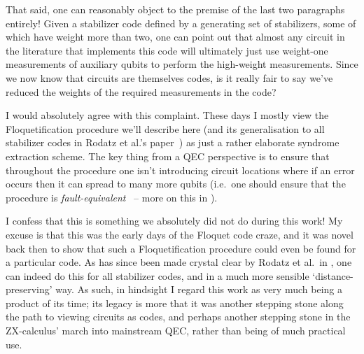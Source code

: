 That said, one can reasonably object to the premise of the last two paragraphs entirely!
Given a stabilizer code defined by a generating set of stabilizers, some of which have weight more than two, one can point out that almost any circuit in the literature that implements this code will ultimately just use weight-one measurements of auxiliary qubits to perform the high-weight measurements.
Since we now know that circuits are themselves codes, is it really fair to say we've reduced the weights of the required measurements in the code?

I would absolutely agree with this complaint.
These days I mostly view the Floquetification procedure we'll describe here (and its generalisation to all stabilizer codes in Rodatz et al.'s paper~\cite{rodatz2024floquetifying}) as just a rather elaborate syndrome extraction scheme.
The key thing from a QEC perspective is to ensure that throughout the procedure one isn't introducing circuit locations where if an error occurs then it can spread to many more qubits (i.e.\ one should ensure that the procedure is \textit{fault-equivalent}~\cite{rodatz2025faulttoleranceconstruction} -- more on this in ).

I confess that this is something we absolutely did not do during this work!
My excuse is that this was the early days of the Floquet code craze, and it was novel back then to show that such a Floquetification procedure could even be found for a particular code.
As has since been made crystal clear by Rodatz et al.\ in , one can indeed do this for all stabilizer codes, and in a much more sensible `distance-preserving' way.
As such, in hindsight I regard this work as very much being a product of its time; its legacy is more that it was another stepping stone along the path to viewing circuits as codes, and perhaps another stepping stone in the ZX-calculus' march into mainstream QEC, rather than being of much practical use.